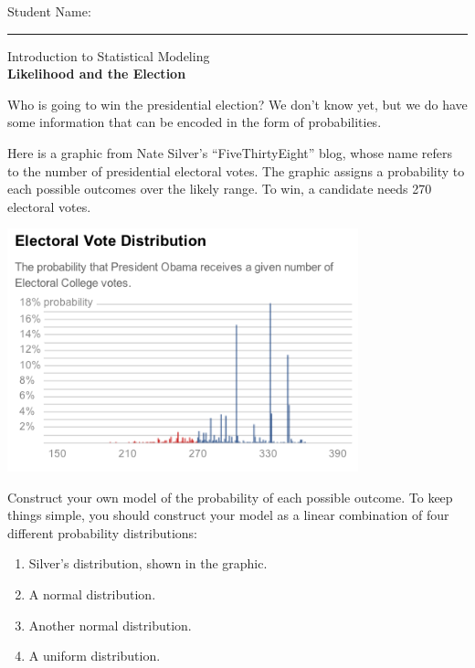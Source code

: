 \documentclass{article}
\begin{document}
\hfill\parbox{3.5in}{\raggedleft Student Name: \rule{2in}{1pt}  }

\bigskip

\bigskip

\bigskip

\begin{centering}
{\Large \sffamily Introduction to Statistical Modeling}\\
\bigskip
{\Large \sffamily \bfseries{Likelihood and the Election}}\\
\bigskip
\end{centering}

Who is going to win the presidential election?  We don't know yet, but we do have some information that can be encoded in the form of probabilities.

Here is a graphic from Nate Silver's ``FiveThirtyEight'' blog, whose name refers to the number of presidential electoral votes.  The graphic assigns a probability to each possible outcomes over the likely range.  To win, a candidate needs 270 electoral votes.


\bigskip

\centerline{\includegraphics[width=4in]{ElectoralCollege.png}}

\bigskip

Construct your own model of the probability of each possible outcome.  To keep things simple, you should construct your model as a linear combination of four different probability distributions:

\begin{enumerate}

\item Silver's distribution, shown in the graphic.

\item A normal distribution.

\item Another normal distribution.

\item A uniform distribution.

\end{enumerate}
\end{document}
